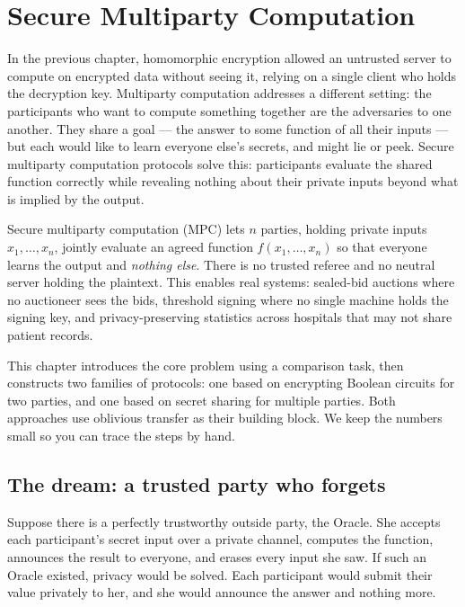 \chapter{Secure Multiparty Computation}

In the previous chapter, homomorphic encryption allowed an untrusted server to compute on encrypted data without seeing it, relying on a single client who holds the decryption key. Multiparty computation addresses a different setting: the participants who want to compute something together are the adversaries to one another. They share a goal --- the answer to some function of all their inputs --- but each would like to learn everyone else's secrets, and might lie or peek. Secure multiparty computation protocols solve this: participants evaluate the shared function correctly while revealing nothing about their private inputs beyond what is implied by the output.

Secure multiparty computation (MPC) lets $n$ parties, holding private inputs $x_1, \dots, x_n$, jointly evaluate an agreed function $f(x_1, \dots, x_n)$ so that everyone learns the output and \emph{nothing else}. There is no trusted referee and no neutral server holding the plaintext. This enables real systems: sealed-bid auctions where no auctioneer sees the bids, threshold signing where no single machine holds the signing key, and privacy-preserving statistics across hospitals that may not share patient records.

This chapter introduces the core problem using a comparison task, then constructs two families of protocols: one based on encrypting Boolean circuits for two parties, and one based on secret sharing for multiple parties. Both approaches use oblivious transfer as their building block. We keep the numbers small so you can trace the steps by hand.

\chapterline

\section{The dream: a trusted party who forgets}
\label{ch34:dream}

Suppose there is a perfectly trustworthy outside party, the Oracle. She accepts each participant's secret input over a private channel, computes the function, announces the result to everyone, and erases every input she saw. If such an Oracle existed, privacy would be solved. Each participant would submit their value privately to her, and she would announce the answer and nothing more.

